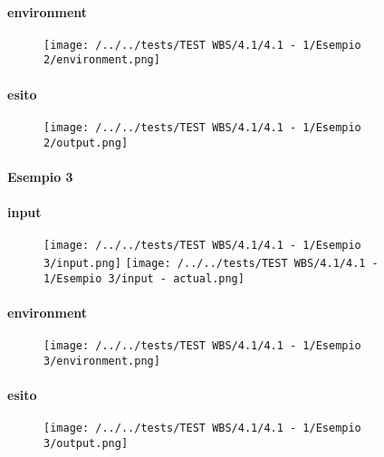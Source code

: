 \paragraph{environment}
\begin{figure}
\centering
\texttt{[image: /../../tests/TEST WBS/4.1/4.1 - 1/Esempio 2/environment.png]}
\end{figure}
\paragraph{esito}
\begin{figure}
\centering
\texttt{[image: /../../tests/TEST WBS/4.1/4.1 - 1/Esempio 2/output.png]}
\end{figure}

\paragraph{Esempio 3}
\paragraph{input}
\begin{figure}
\centering
\texttt{[image: /../../tests/TEST WBS/4.1/4.1 - 1/Esempio 3/input.png]}
\texttt{[image: /../../tests/TEST WBS/4.1/4.1 - 1/Esempio 3/input - actual.png]}
\end{figure}
\paragraph{environment}
\begin{figure}
\centering
\texttt{[image: /../../tests/TEST WBS/4.1/4.1 - 1/Esempio 3/environment.png]}
\end{figure}
\paragraph{esito}
\begin{figure}
\centering
\texttt{[image: /../../tests/TEST WBS/4.1/4.1 - 1/Esempio 3/output.png]}
\end{figure}
